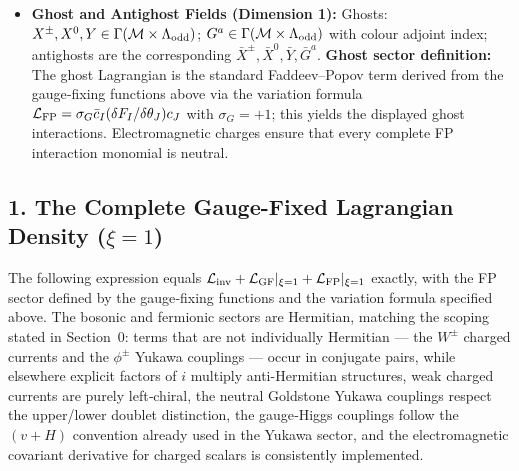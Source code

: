 \documentclass{article}
\begin{document}
\begin{itemize}
    The gauge fields use the same rotation: $W_\mu^\pm = (W_\mu^1 \mp i W_\mu^2)/\sqrt2$, $W_\mu^3 = c_w Z_\mu + s_w A_\mu$, $B_\mu = c_w A_\mu - s_w Z_\mu$.
    \item \textbf{Ghost and Antighost Fields (Dimension 1):} 
    Ghosts: $X^\pm, X^0, Y \in \Gamma(\mathcal M\times\Lambda_{\rm odd})$; $G^a \in \Gamma(\mathcal M\times\Lambda_{\rm odd})$ with colour adjoint index; antighosts are the corresponding $\bar{X}^\pm, \bar{X}^0, \bar{Y}, \bar{G}^a$.
    \textbf{Ghost sector definition:} The ghost Lagrangian is the standard Faddeev–Popov term derived from the gauge‑fixing functions above via the variation formula $\mathcal L_{\rm FP} = \sigma_G \bar c_I (\delta F_I/\delta \theta_J) c_J$ with $\sigma_G = +1$; this yields the displayed ghost interactions. Electromagnetic charges ensure that every complete FP interaction monomial is neutral.
\end{itemize}

\subsection*{1. The Complete Gauge-Fixed Lagrangian Density ($\xi=1$)}
The following expression equals $\mathcal L_{\rm inv} + \mathcal L_{\rm GF}|_{\xi=1} + \mathcal L_{\rm FP}|_{\xi=1}$ exactly, with the FP sector defined by the gauge‑fixing functions and the variation formula specified above. The bosonic and fermionic sectors are Hermitian, matching the scoping stated in Section~0: terms that are not individually Hermitian --- the $W^\pm$ charged currents and the $\phi^\pm$ Yukawa couplings --- occur in conjugate pairs, while elsewhere explicit factors of $i$ multiply anti-Hermitian structures, weak charged currents are purely left‑chiral, the neutral Goldstone Yukawa couplings respect the upper/lower doublet distinction, the gauge‑Higgs couplings follow the $(v+H)$ convention already used in the Yukawa sector, and the electromagnetic covariant derivative for charged scalars is consistently implemented.
\end{document}
